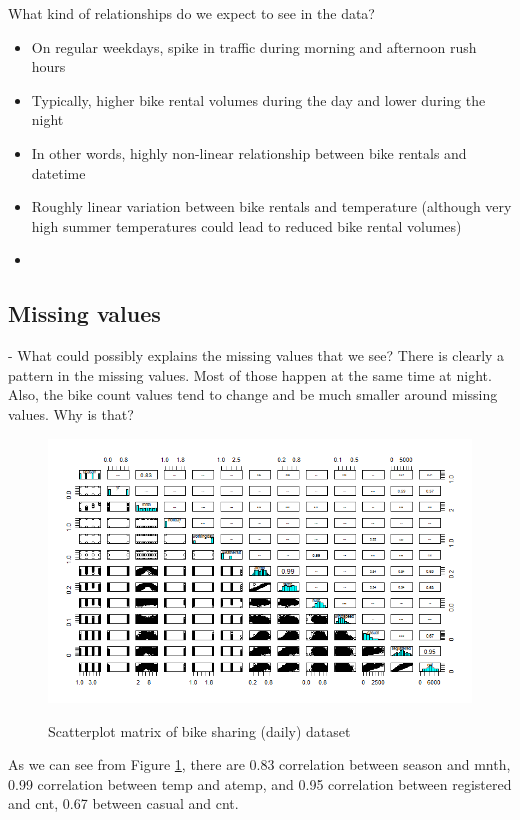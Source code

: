 \documentclass[12pt]{article}
\begin{document}
What kind of relationships do we expect to see in the data?
\begin{itemize}
	\item On regular weekdays, spike in traffic during morning and afternoon rush hours
	\item Typically, higher bike rental volumes during the day and lower during the night
	\item In other words, highly non-linear relationship between bike rentals and datetime
	\item Roughly linear variation between bike rentals and temperature (although very high summer temperatures could lead to reduced bike rental volumes)
	\item 
\end{itemize}
 
\subsection{Missing values}

- What could possibly explains the missing values that we see?
There is clearly a pattern in the missing values. Most of those happen at the same time at night.
Also, the bike count values tend to change and be much smaller around missing values. Why is that?


\begin{figure}[H]
	\includegraphics[scale=0.6]{figures/scatterplot.png}
	\label{fig:scatterplot}
	\caption{Scatterplot matrix of bike sharing (daily) dataset}
\end{figure}

As we can see from Figure \ref{fig:scatterplot}, there are 0.83 correlation between season and mnth, 0.99 correlation between temp and atemp, and 0.95 correlation between registered and cnt, 0.67 between casual and cnt.
\end{document}
